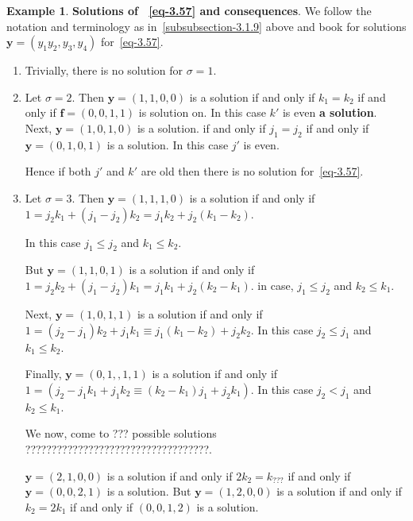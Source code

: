 \documentclass[a4paper,12pt]{article}
\theoremstyle{definition}
\theoremstyle{underlinethm}
\newtheorem{example}{Example}[section]
\theoremstyle{definition}
\begin{document}
\begin{example}\label{example-3.5}
\textbf{Solutions of ~\eqref{eq-3.57} and consequences}. We follow the notation and terminology as in~\eqref{subsubsection-3.1.9} above and book for solutions $\mathbf{y}=\left(y_{1} y_{2}, y_{3}, y_{4}\right)$ for~\eqref{eq-3.57}.
\end{example}
\begin{enumerate}[label=(\alph*)]

\item Trivially, there is no solution for $\sigma=1$.

\item Let $\sigma=2$. Then $\mathbf{y} = (1,1,0,0)$ is a solution if and only if $k_{1}=k_{2}$ if and only if $\mathbf{f}= (0,0,1,1)$ is solution on. In this case $k'$ is even \textbf{a solution}. Next, $\mathbf{y} = (1,0,1,0)$ is a solution. if and only if $j_{1}=j_{2}$ if and only if $\mathbf{y}= (0,1,0,1)$ is a solution. In this case $j'$ is even.

Hence if both $j'$ and $k'$ are old then there is no solution for~\eqref{eq-3.57}.

\item Let $\sigma = 3$. Then $\mathbf{y} = (1,1,1,0)$ is a solution if and only if $1 = j_{2}k_{1} + (j_{1}-j_{2})k_{2} = j_{1}k_{2} + j_{2}(k_{1}-k_{2})$.

In this case $j_{1}\leq j_{2}$ and $k_{1} \leq k_{2}$.

But $\mathbf{y} = (1,1,0,1)$ is a solution if and only if $1=j_{2}k_{2} + (j_{1}-j_{2})k_{1}=j_{1}k_{1} + j_{2}\left(k_{2}-k_{1}\right)$. in case, $j_{1} \leq j_{2}$ and $k_{2} \leq k_{1}$.

Next, $\mathbf{y} = (1,0,1,1)$ is a solution if and only if $1=\left(j_{2}-j_{1}\right)k_{2} + j_{1}k_{1} \equiv j_{1}(k_{1}-k_{2}) + j_{2} k_{2}$. In this case $j_{2} \leq j_{1}$ and $k_{1}\leq k_{2}$.

Finally, $\mathbf{y}=(0,1,,1,1)$ is a solution if and only if\\ $1=\left(j_{2}-j_{1} k_{1} + j_{1}k_{2}\equiv \left(k_{2}-k_{1}\right)j_{1} + j_{2}k_{1} \right)$. In this case $j_{2} < j_{1}$ and $k_{2}\leq k_{1}$.

We now, come to ??? possible solutions ???????????????????????????????????.

$\mathbf{y}=(2,1,0,0)$ is a solution if and only if $2k_{2}=k_{???}$ if and only if $\mathbf{y}=(0,0,2,1)$ is a solution. But $\mathbf{y}=(1,2,0,0)$ is a solution if and only if $k_{2}=2k_{1}$ if and only if $(0,0,1,2)$ is a solution.


\end{enumerate}
\end{document}

